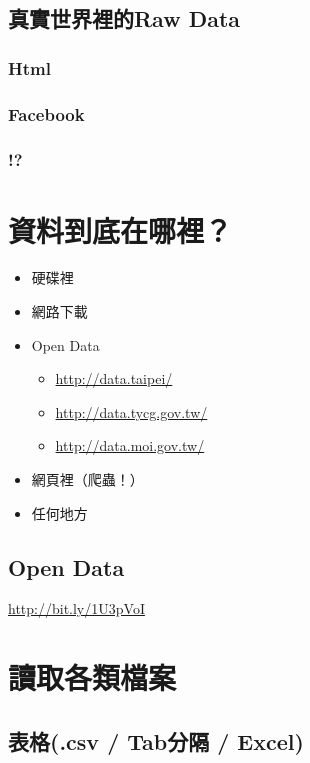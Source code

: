 \documentclass[]{book}
\providecommand{\tightlist}{%
  \setlength{\itemsep}{0pt}\setlength{\parskip}{0pt}}
\theoremstyle{definition}
\theoremstyle{definition}
\theoremstyle{remark}
\begin{document}
\subsection{真實世界裡的Raw Data}\label{raw-data}

\subsubsection{Html}\label{html}

\subsubsection{Facebook}\label{facebook}

\subsubsection{!?}\label{section}

\section{資料到底在哪裡？}

\begin{itemize}
\tightlist
\item
  硬碟裡
\item
  網路下載
\item
  Open Data

  \begin{itemize}
  \tightlist
  \item
    \url{http://data.taipei/}
  \item
    \url{http://data.tycg.gov.tw/}
  \item
    \url{http://data.moi.gov.tw/}
  \end{itemize}
\item
  網頁裡（爬蟲！）
\item
  任何地方
\end{itemize}

\subsection{Open Data}\label{open-data}

\url{http://bit.ly/1U3pVoI}

\section{讀取各類檔案}

\subsection{表格(.csv / Tab分隔 / Excel)}\label{.csv-tab-excel}
\end{document}
